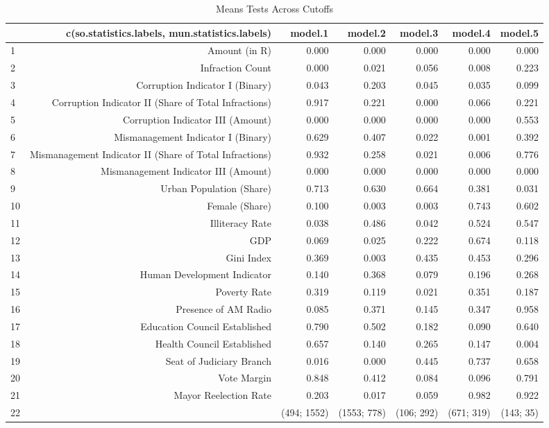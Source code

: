 \begin{table}[!htbp]
\centering
\caption{Means Tests Across Cutoffs} 
\label{tab:covariates}
\begin{tabular}{lrrrrrr}
  \hline
\hline
 & c(so.statistics.labels, mun.statistics.labels) & model.1 & model.2 & model.3 & model.4 & model.5 \\ 
  \hline
1 & Amount (in R) & 0.000 & 0.000 & 0.000 & 0.000 & 0.000 \\ 
  2 & Infraction Count & 0.000 & 0.021 & 0.056 & 0.008 & 0.223 \\ 
  3 & Corruption Indicator I (Binary) & 0.043 & 0.203 & 0.045 & 0.035 & 0.099 \\ 
   \hline
4 & Corruption Indicator II (Share of Total Infractions) & 0.917 & 0.221 & 0.000 & 0.066 & 0.221 \\ 
  5 & Corruption Indicator III (Amount) & 0.000 & 0.000 & 0.000 & 0.000 & 0.553 \\ 
  6 & Mismanagement Indicator I (Binary) & 0.629 & 0.407 & 0.022 & 0.001 & 0.392 \\ 
   \hline
7 & Mismanagement Indicator II (Share of Total Infractions) & 0.932 & 0.258 & 0.021 & 0.006 & 0.776 \\ 
  8 & Mismanagement Indicator III (Amount) & 0.000 & 0.000 & 0.000 & 0.000 & 0.000 \\ 
  9 & Urban Population (Share) & 0.713 & 0.630 & 0.664 & 0.381 & 0.031 \\ 
  10 & Female (Share) & 0.100 & 0.003 & 0.003 & 0.743 & 0.602 \\ 
  11 & Illiteracy Rate & 0.038 & 0.486 & 0.042 & 0.524 & 0.547 \\ 
  12 & GDP & 0.069 & 0.025 & 0.222 & 0.674 & 0.118 \\ 
  13 & Gini Index & 0.369 & 0.003 & 0.435 & 0.453 & 0.296 \\ 
  14 & Human Development Indicator & 0.140 & 0.368 & 0.079 & 0.196 & 0.268 \\ 
  15 & Poverty Rate & 0.319 & 0.119 & 0.021 & 0.351 & 0.187 \\ 
  16 & Presence of AM Radio & 0.085 & 0.371 & 0.145 & 0.347 & 0.958 \\ 
  17 & Education Council Established & 0.790 & 0.502 & 0.182 & 0.090 & 0.640 \\ 
  18 & Health Council Established & 0.657 & 0.140 & 0.265 & 0.147 & 0.004 \\ 
  19 & Seat of Judiciary Branch & 0.016 & 0.000 & 0.445 & 0.737 & 0.658 \\ 
  20 & Vote Margin & 0.848 & 0.412 & 0.084 & 0.096 & 0.791 \\ 
  21 & Mayor Reelection Rate & 0.203 & 0.017 & 0.059 & 0.982 & 0.922 \\ 
  22 &  & (494; 1552) & (1553; 778) & (106; 292) & (671; 319) & (143; 35) \\ 
   \hline
\hline
\end{tabular}
\end{table}
